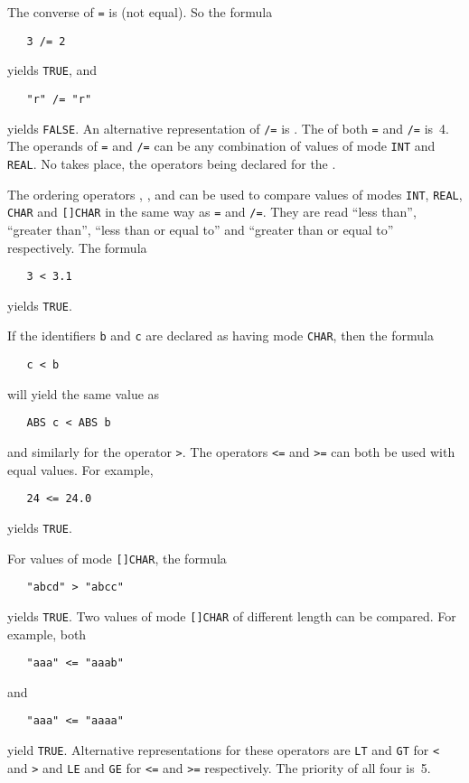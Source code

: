 The converse of \verb|=| is \ixtt{/=} (not equal). So the formula
\begin{verbatim}
   3 /= 2
\end{verbatim}
\noindent
yields \verb|TRUE|, and
\begin{verbatim}
   "r" /= "r"
\end{verbatim}
\noindent
yields \verb|FALSE|.  An alternative representation of \verb|/=| is
.  The  of both \verb|=| and \verb|/=| is~4.
The operands of \verb|=| and \verb|/=| can be any combination of
values of mode \verb|INT| and \verb|REAL|.  No
 takes place, the operators being
declared for the .

The ordering operators \ixtt{<}, \ixtt{>}, \ixtt{<=} and \ixtt{>=}
can be used to compare values of modes \verb|INT|, \verb|REAL|,
\verb|CHAR| and \verb|[]CHAR| in the same way as \verb|=| and
\verb|/=|.  They are read ``less than'', ``greater than'', ``less
than or equal to'' and ``greater than or equal to'' respectively. The
formula
\begin{verbatim}
   3 < 3.1
\end{verbatim}
\noindent
yields \verb|TRUE|.

If the identifiers \verb|b| and \verb|c| are declared as having mode
\verb|CHAR|, then the formula
\begin{verbatim}
   c < b
\end{verbatim}
\noindent
will yield the same value as
\begin{verbatim}
   ABS c < ABS b
\end{verbatim}
\noindent
and similarly for the operator \verb|>|. The operators \verb|<=| and
\verb|>=| can both be used with equal values.  For example,
\begin{verbatim}
   24 <= 24.0
\end{verbatim}
\noindent
yields \verb|TRUE|.

For values of mode \verb|[]CHAR|, the formula
\begin{verbatim}
   "abcd" > "abcc"
\end{verbatim}
\noindent
yields \verb|TRUE|. Two values of mode \verb|[]CHAR| of different
length can be compared. For example, both
\begin{verbatim}
   "aaa" <= "aaab"
\end{verbatim}
\noindent
and
\begin{verbatim}
   "aaa" <= "aaaa"
\end{verbatim}
\noindent
yield \verb|TRUE|. Alternative representations for these operators
are \verb|LT| and \verb|GT| for \verb|<| and \verb|>| and \verb|LE|
and \verb|GE| for \verb|<=| and \verb|>=| respectively. The priority
of all four  is~5.

